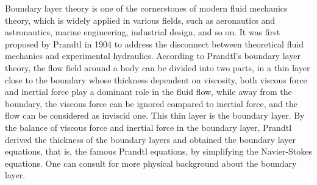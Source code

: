 \documentclass{amsart}
\numberwithin{equation}{section}
\begin{document}
Boundary layer theory is one of the cornerstones of modern fluid mechanics theory, which is widely applied in various fields, such as aeronautics and astronautics, marine engineering, industrial design, and so on. It was first proposed by Prandtl \cite{Prandtl} in 1904 to address the disconnect between theoretical fluid mechanics and experimental hydraulics. According to Prandtl's boundary layer theory, the flow field around a body can be divided into two parts, in a thin layer close to the boundary whose thickness dependent on viscosity, both viscous force and inertial force play a dominant role in the fluid flow, while away from the boundary, the viscous force can be ignored compared to inertial force, and the flow can be considered as inviscid one. This thin layer is the boundary layer. By the balance of viscous force and inertial force in the boundary layer, Prandtl derived the thickness of the boundary layers and obtained the boundary layer equations, that is, the famous Prandtl equations, by simplifying the Navier-Stokes equations. One can consult \cite{SG} for more physical background about the boundary layer.
\end{document}
